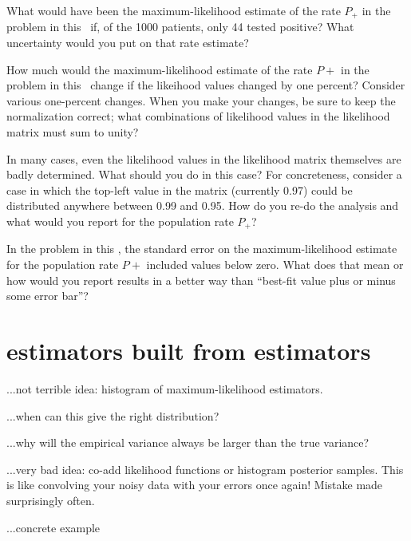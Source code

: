 \documentclass[12pt,twoside]{article}
\begin{document}
\begin{problem}
What would have been the maximum-likelihood estimate of the rate $P_+$
in the problem in this \sectionname\ if, of the 1000 patients, only 44
tested positive?  What uncertainty would you put on that rate
estimate?
\end{problem}

\begin{problem}
How much would the maximum-likelihood estimate of the rate $P+$ in the
problem in this \sectionname\ change if the likeihood values changed
by one percent?  Consider various one-percent changes.  When you make
your changes, be sure to keep the normalization correct; what
combinations of likelihood values in the likelihood matrix must sum to
unity?
\end{problem}

\begin{problem}
In many cases, even the likelihood values in the likelihood matrix
themselves are badly determined.  What should you do in this case?
For concreteness, consider a case in which the top-left value in the
matrix (currently 0.97) could be distributed anywhere between 0.99 and
0.95.  How do you re-do the analysis and what would you report for the
population rate $P_+$?
\end{problem}

\begin{problem}
In the problem in this \sectionname, the standard error on the
maximum-likelihood estimate for the population rate $P+$ included
values below zero.  What does that mean or how would you report
results in a better way than ``best-fit value plus or minus some error
bar''?
\end{problem}

\section{estimators built from estimators}

...not terrible idea: histogram of maximum-likelihood estimators.

...when can this give the right distribution?

...why will the empirical variance always be larger than the true variance?

...very bad idea: co-add likelihood functions or histogram posterior
samples.  This is like convolving your noisy data with your errors
once again!  Mistake made surprisingly often.

...concrete example
\end{document}

